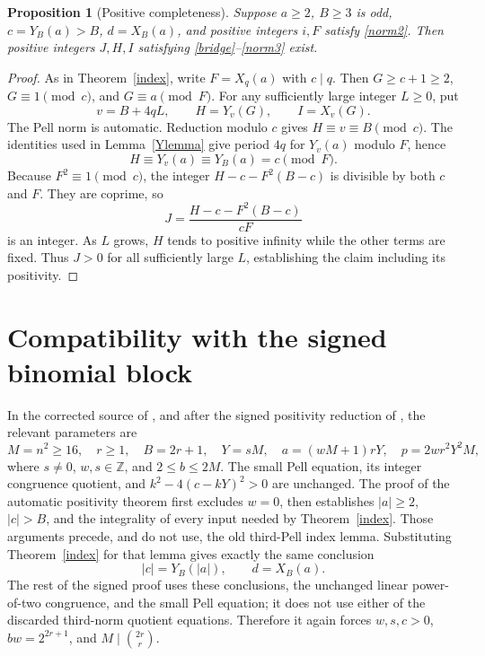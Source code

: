 \documentclass[11pt]{article}
\newtheorem{proposition}[theorem]{Proposition}
\newcommand{\Z}{\mathbb Z}\newcommand{\Q}{\mathbb Q}
\begin{document}
\begin{proposition}[Positive completeness]\label{complete}
Suppose \(a\ge2\), \(B\ge3\) is odd,
\(c=Y_B(a)>B\), \(d=X_B(a)\), and positive integers \(i,F\)
satisfy \eqref{norm2}. Then positive integers \(J,H,I\) satisfying
\eqref{bridge}--\eqref{norm3} exist.
\end{proposition}
\begin{proof}
As in Theorem~\ref{index}, write \(F=X_q(a)\) with \(c\mid q\).
Then \(G\ge c+1\ge2\), \(G\equiv1\pmod c\), and
\(G\equiv a\pmod F\). For any sufficiently large integer
\(L\ge0\), put
\[
 v=B+4qL,\qquad H=Y_v(G),\qquad I=X_v(G).
\]
The Pell norm is automatic. Reduction modulo \(c\) gives
\(H\equiv v\equiv B\pmod c\). The identities used in
Lemma~\ref{Ylemma} give period \(4q\) for \(Y_v(a)\) modulo
\(F\), hence
\[
 H\equiv Y_v(a)\equiv Y_B(a)=c\pmod F.
\]
Because \(F^2\equiv1\pmod c\), the integer
\(H-c-F^2(B-c)\) is divisible by both \(c\) and \(F\).
They are coprime, so
\[
                   J=\frac{H-c-F^2(B-c)}{cF}
\]
is an integer. As \(L\) grows, \(H\) tends to positive infinity
while the other terms are fixed. Thus \(J>0\) for all sufficiently
large \(L\), establishing the claim including its positivity.
\end{proof}

\section{Compatibility with the signed binomial block}

In the corrected source of \cite{Corrected}, and after the signed
positivity reduction of \cite{Signed}, the relevant parameters are
\[
 M=n^2\ge16,\quad r\ge1,\quad B=2r+1,\quad
 Y=sM,\quad a=(wM+1)rY,\quad p=2wr^2Y^2M,
\]
where \(s\ne0\), \(w,s\in\Z\), and \(2\le b\le2M\).
The small Pell equation, its integer congruence quotient, and
\(k^2-4(c-kY)^2>0\) are unchanged. The proof of the automatic
positivity theorem first excludes \(w=0\), then establishes
\(|a|\ge2\), \(|c|>B\), and the integrality of every input needed
by Theorem~\ref{index}. Those arguments precede, and do not use,
the old third-Pell index lemma. Substituting Theorem~\ref{index}
for that lemma gives exactly the same conclusion
\[
                 |c|=Y_B(|a|),\qquad d=X_B(a).
\]
The rest of the signed proof uses these conclusions, the unchanged
linear power-of-two congruence, and the small Pell equation; it does
not use either of the discarded third-norm quotient equations.
Therefore it again forces \(w,s,c>0\),
\(bw=2^{2r+1}\), and \(M\mid\binom{2r}{r}\).
\end{document}
